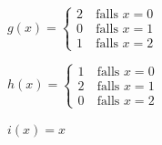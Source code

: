 \documentclass[12pt,a4paper]{article}
\theoremstyle{custom}
\begin{document}
\begin{minipage}{0.35\textwidth}
\centering
$g(x)= \begin{cases}
2 & \ \text{falls } x = 0 \\ 
0 & \ \text{falls } x = 1 \\
1 & \ \text{falls } x = 2 
\end{cases}$
\end{minipage}
\begin{minipage}{0.35\textwidth}
\centering
$h(x)= \begin{cases}
1 & \ \text{falls } x = 0 \\ 
2 & \ \text{falls } x = 1 \\
0 & \ \text{falls } x = 2 
\end{cases}$
\end{minipage}
\begin{minipage}{0.3\textwidth}
\centering
$i(x) = x$
\end{minipage}
\vspace*{1em}
\end{document}
